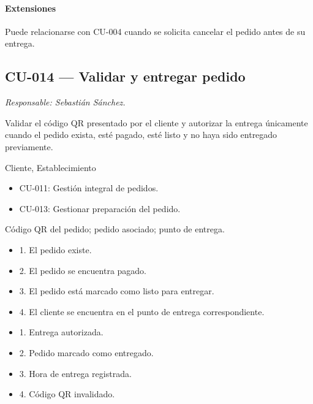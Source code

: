 \paragraph{Extensiones}
Puede relacionarse con CU-004 cuando se solicita cancelar el pedido antes de su entrega.

\subsection{CU-014 --- Validar y entregar pedido}
\label{cu:cu-014}
\textit{Responsable: Sebastián Sánchez.}

\begin{description}[leftmargin=!, labelwidth=3.4cm, style=nextline, topsep=3pt]
\item[Objetivo] Validar el código QR presentado por el cliente y autorizar la entrega únicamente cuando el pedido exista, esté pagado, esté listo y no haya sido entregado previamente.

\item[Actores] Cliente, Establecimiento

\item[CU relacionados] \hfill
\begin{itemize}[leftmargin=1.2em, topsep=1pt]
  \item CU-011: Gestión integral de pedidos.
  \item CU-013: Gestionar preparación del pedido.
\end{itemize}

\item[Entradas] Código QR del pedido; pedido asociado; punto de entrega.

\item[Pre-condiciones] \hfill
\begin{itemize}[leftmargin=1.2em, topsep=1pt]
  \item 1. El pedido existe.
  \item 2. El pedido se encuentra pagado.
  \item 3. El pedido está marcado como listo para entregar.
  \item 4. El cliente se encuentra en el punto de entrega correspondiente.
\end{itemize}

\item[Salidas] \hfill
\begin{itemize}[leftmargin=1.2em, topsep=1pt]
  \item 1. Entrega autorizada.
  \item 2. Pedido marcado como entregado.
  \item 3. Hora de entrega registrada.
  \item 4. Código QR invalidado.
\end{itemize}


\end{description}
